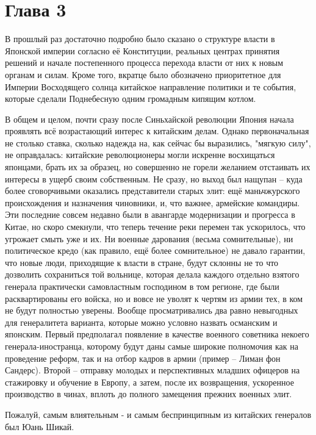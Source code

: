 \chapter{Глава 3}

В прошлый раз достаточно подробно было сказано о структуре власти в Японской империи согласно её Конституции, реальных центрах принятия решений и начале постепенного процесса перехода власти от них к новым органам и силам. Кроме того, вкратце было обозначено приоритетное для Империи Восходящего солнца китайское направление политики и те события, которые сделали Поднебесную одним громадным кипящим котлом.

В общем и целом, почти сразу после Синьхайской революции Япония начала проявлять всё возрастающий интерес к китайским делам. Однако первоначальная не столько ставка, сколько надежда на, как сейчас бы выразились, "мягкую силу", не оправдалась: китайские революционеры могли искренне восхищаться японцами, брать их за образец, но совершенно не горели желанием отстаивать их интересы в ущерб своим собственным. Не сразу, но выход был нащупан – куда более сговорчивыми оказались представители старых элит: ещё маньчжурского происхождения и назначения чиновники, и, что важнее, армейские командиры. Эти последние совсем недавно были в авангарде модернизации и прогресса в Китае, но скоро смекнули, что теперь течение реки перемен так ускорилось, что угрожает смыть уже и их. Ни военные дарования (весьма сомнительные), ни политическое кредо (как правило, ещё более сомнительное) не давало гарантии, что новые люди, приходящие к власти в стране, будут склонны не то что дозволить сохраниться той вольнице, которая делала каждого отдельно взятого генерала практически самовластным господином в том регионе, где были расквартированы его войска, но и вовсе не уволят к чертям из армии тех, в ком не будут полностью уверены. Вообще просматривались два равно невыгодных для генералитета варианта, которые можно условно назвать османским и японским. Первый предполагал появление в качестве военного советника некоего генерала-иностранца, которому будут даны самые широкие полномочия как на проведение реформ, так и на отбор кадров в армии (пример – Лиман фон Сандерс). Второй – отправку молодых и перспективных младших офицеров на стажировку и обучение в Европу, а затем, после их возвращения, ускоренное производство в чинах, вплоть до полного замещения прежних военных элит.

Пожалуй, самым влиятельным - и самым беспринципным из китайских генералов был Юань Шикай. 

